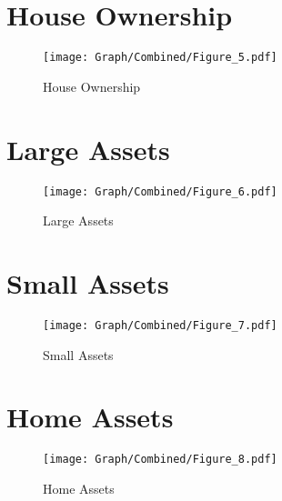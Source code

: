 \documentclass[10pt,a4paper]{article}
\begin{document}
\section{House Ownership}
\begin{table}[H]\centering

\end{table}
\begin{figure}[H]\centering
\texttt{[image: Graph/Combined/Figure\_5.pdf]}
\caption{House Ownership} \label{fig:Fig_5}
\end{figure}
\begin{table}[H]\centering

\end{table}
\pagebreak
\section{Large Assets}
\begin{table}[H]\centering

\end{table}
\begin{figure}[H]\centering
\texttt{[image: Graph/Combined/Figure\_6.pdf]}
\caption{Large Assets} \label{fig:Fig_6}
\end{figure}
\begin{table}[H]\centering

\end{table}
\pagebreak
\section{Small Assets}
\begin{table}[H]\centering

\end{table}
\begin{figure}[H]\centering
\texttt{[image: Graph/Combined/Figure\_7.pdf]}
\caption{Small Assets} \label{fig:Fig_7}
\end{figure}
\begin{table}[H]\centering

\end{table}
\pagebreak
\section{Home Assets}
\begin{table}[H]\centering

\end{table}
\begin{figure}[H]\centering
\texttt{[image: Graph/Combined/Figure\_8.pdf]}
\caption{Home Assets} \label{fig:Fig_8}
\end{figure}
\begin{table}[H]\centering

\end{table}
\pagebreak
\end{document}
